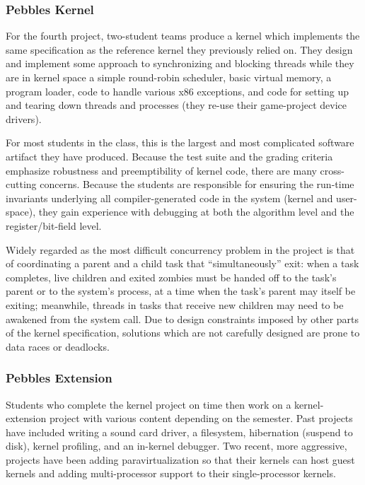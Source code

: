 \subsubsection{Pebbles Kernel}
For the fourth project, two-student teams
produce a kernel which implements the
same specification as the reference kernel
they previously relied on.
They design and implement some approach to
synchronizing and blocking threads while
they are in kernel space
a simple round-robin scheduler,
basic virtual memory,
a program loader,
code to handle various x86 exceptions,
and code for setting up and tearing down
threads and processes
(they re-use their game-project device drivers).

For most students in the class, this is the
largest and most complicated software artifact they
have produced.
Because the test suite and the grading criteria
emphasize robustness and preemptibility of
kernel code,
there are many cross-cutting concerns.
%
Because the students are responsible for ensuring
the run-time invariants underlying all compiler-generated
code in the system (kernel and user-space),
they gain experience with debugging at both the
algorithm level and the register/bit-field level.

Widely regarded as the most difficult concurrency problem in the project
is that of coordinating a parent and a child task that ``simultaneously''
exit:
when a task completes,
live children and exited zombies must be handed off
to the task's parent or to the system's  process,
at a time when the task's parent may itself be
exiting;
meanwhile, threads in tasks that receive new children
may need to be awakened from the  system call.
Due to design constraints imposed by other parts of the kernel specification,
solutions which are not carefully designed
are prone to data races or deadlocks.

\subsubsection{Pebbles Extension}
Students who complete the kernel project on time
then work on a kernel-extension project
{with various content depending on the semester.}
Past projects have included
writing a sound card driver,
a filesystem,
hibernation (suspend to disk),
kernel profiling,
and an in-kernel debugger.
Two recent, more aggressive, projects have been
adding paravirtualization so that their kernels
can host guest kernels and
adding multi-processor support to their single-processor kernels.

